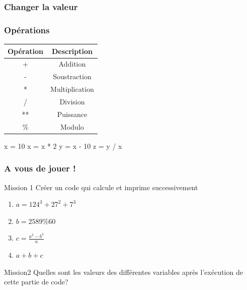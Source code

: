 \documentclass[handout]{beamer}
\begin{document}
\begin{frame}
\frametitle{Changer la valeur}
\reass
\end{frame}
\begin{frame}
\frametitle{Opérations}
\begin{table}[!h]
    \centering
    \begin{tabular}{|c|c|}
        \hline
         Opération & Description\\
        \hline
        + & Addition \\
        \hline
        - & Soustraction \\
        \hline
        * & Multiplication \\
        \hline
        / & Division  \\
        \hline
        **  & Puissance \\
        \hline
        \% & Modulo \\
        \hline
    \end{tabular}
    \label{oper}
\end{table}
\oper
\end{frame}
\opera
{\begin{python}
x = 10
x = x * 2
y = x - 10
z = y / x
\end{python}
}
\begin{frame}
\frametitle{A vous de jouer !}
    \begin{block}{Mission 1}
    Créer un code qui calcule et imprime successivement 
    \begin{enumerate}
    \item $a = 124^3 + 27^2 + 7^3$
    \item $b = 2589 \% 60$
    \item $c =\frac{a^2 - b^3}{a}$
    \item $a+b+c$
    \end{enumerate}
    \end{block}
    \begin{block}{Mission2}
    Quelles sont les valeurs des différentes variables après l'exécution de
        cette partie de code?
        \opera
    \end{block}
\end{frame}
\end{document}

